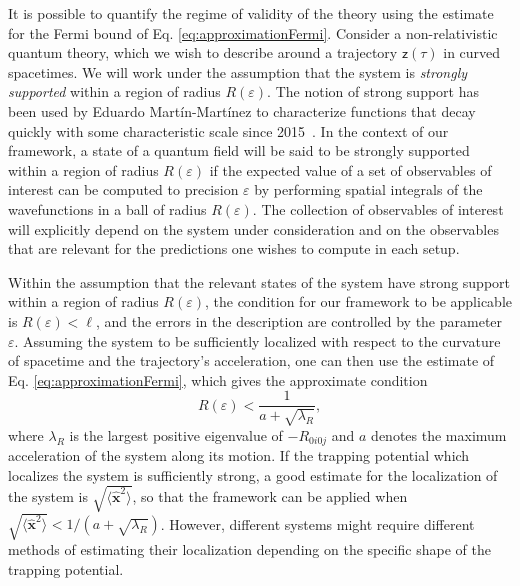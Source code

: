 \documentclass[prd,twocolumn,superscriptaddress,floatfix,amsmath,amssymb,amsfonts,longbibliography,nofootinbib]{revtex4-1}
\newcommand{\mf}{\mathsf}%
\begin{document}
It is possible to quantify the regime of validity of the theory using the estimate for the Fermi bound of Eq. \eqref{eq:approximationFermi}. Consider a non-relativistic quantum theory, which we wish to describe around a trajectory $\mf z(\tau)$ in curved spacetimes. We will work under the assumption that the system is \emph{strongly supported} within a region of radius $R(\varepsilon)$. The notion of strong support has been used by Eduardo Mart\'in-Mart\'inez to characterize functions that decay quickly with some characteristic scale since 2015~\cite{strongSupport}. In the context of our framework, a state of a quantum field will be said to be strongly supported within a region of radius $R(\varepsilon)$ if the expected value of a set of observables of interest can be computed to precision $\varepsilon$ by performing spatial integrals of the wavefunctions in a ball of radius $R(\varepsilon)$. The collection of observables of interest will explicitly depend on the system under consideration and on the observables that are relevant for the predictions one wishes to compute in each setup.

Within the assumption that the relevant states of the system have strong support within a region of radius $R(\varepsilon)$, the condition for our framework to be applicable is $R(\varepsilon)<\ell$, and the errors in the description are controlled by the parameter $\varepsilon$. Assuming the system to be sufficiently localized with respect to the curvature of spacetime and the trajectory's acceleration, one can then use the estimate of Eq. \eqref{eq:approximationFermi}, which gives the approximate condition
\begin{equation}
    R(\varepsilon)<\frac{1}{a + \sqrt{\lambda_R}},
\end{equation}
where $\lambda_R$ is the largest positive eigenvalue of $-R_{0i0j}$ and $a$ denotes the maximum acceleration of the system along its motion. If the trapping potential which localizes the system is sufficiently strong, a good estimate for the localization of the system is $\sqrt{\langle\hat{\bm x}^2\rangle}$, so that the framework can be applied when $\sqrt{\langle\hat{\bm x}^2\rangle}<1/(a+\sqrt{\lambda_R})$. However, different systems might require different methods of estimating their localization depending on the specific shape of the trapping potential.
\end{document}
